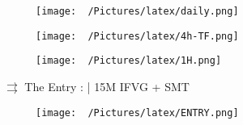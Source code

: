 \documentclass{article}
\begin{document}
\newpage

\centering
\begin{figure}[h!]
\begin{adjustbox}{width=1.1\textwidth,center}
  \texttt{[image: ~/Pictures/latex/daily.png]}
\end{adjustbox}
  \label{fig:image}
\end{figure}


\begin{figure}[h!]
\begin{adjustbox}{width=1.1\textwidth,center}
  \texttt{[image: ~/Pictures/latex/4h-TF.png]}
\end{adjustbox}
  \label{fig:image}
\end{figure}


\begin{figure}[h!]
  \begin{adjustbox}{width=1.1\textwidth,center}
  \texttt{[image: ~/Pictures/latex/1H.png]}
\end{adjustbox}
  \label{fig:image}
\end{figure}
\newpage


\( \rightrightarrows \) The Entry : |  15M IFVG + SMT
\begin{figure}[h!]
  \begin{adjustbox}{width=1.1\textwidth,center}
  \texttt{[image: ~/Pictures/latex/ENTRY.png]}
\end{adjustbox}
\label{fig:image}
\end{figure}

\end{document}
